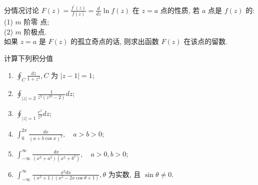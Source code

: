 \documentclass[10pt]{article}
\newenvironment{problem}[2][]{\begin{trivlist}
\item[\hskip \labelsep {\bfseries #1}\hskip \labelsep {\bfseries #2}]}{\end{trivlist}}
\begin{document}
  
\begin{problem}{4.5}
分情况讨论 $F(z)=\frac{f^{\prime}(z)}{f(z)}=\frac{d}{d z} \ln f(z)$ 在 $z=a$ 点的性质, 
  若 $a$ 点是 $f(z)$ 的: 
  \\
  (1) $m$ 阶零 点; 
  \\
  (2) $m$ 阶极点.
  \\
  如果 $z=a$ 是 $F(z)$ 的孤立奇点的话, 则求出函数 $F(z)$ 在该点的留数.
\end{problem}


\begin{problem}{4.6}
  计算下列积分值
  \begin{enumerate}
    \item $\oint_C \frac{d z}{1+z^4}, C$ 为 $|z-1|=1$;
    \item $\oint_{|z|=2} \frac{1}{z^3\left(z^{10}-2\right)} d z$;
    \item $\oint_{|z|=1} \frac{e^z}{z^3} d z$; 
    \item $\int_0^{2 \pi} \frac{d x}{(a+b \cos x)^2}, \quad a>b>0$;
    \item $\int_{-\infty}^{\infty} \frac{d x}{(x^2 + a^2)(x^2+b^2)}, \quad a>0, b>0$;
    \item $\int_{-\infty}^{\infty} \frac{x^2 d x}{\left(x^2+1\right)\left(x^2-2 x \cos \theta+1\right)}, \theta$ 为实数, 且 $\sin \theta \neq 0$.
  \end{enumerate}

\end{problem}
  
\end{document}
